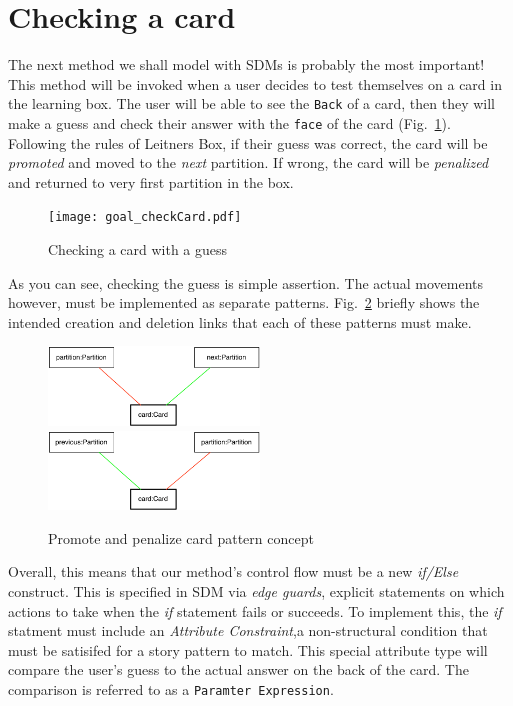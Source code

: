 \newpage
\section{Checking a card}
\genHeader
\hypertarget{sec:checkCard}{}

The next method we shall model with SDMs is probably the most important! This method will be invoked when a user decides to test themselves on a card in the
learning box. The user will be able to see the \texttt{Back} of a card, then they will make a guess and check their answer with the \texttt{face} of the
card (Fig.~\ref{fig:goal_check}). Following the rules of Leitners Box, if their guess was correct, the card will be \emph{promoted} and moved to the
\emph{next} partition. If wrong, the card will be \emph{penalized} and returned to very first partition in the box.

\begin{figure}[htbp]
 	\centering
   \texttt{[image: goal\_checkCard.pdf]}
 	\caption{Checking a card with a guess}
 	\label{fig:goal_check}
\end{figure}
\FloatBarrier

As you can see, checking the guess is simple assertion. The actual movements however, must be implemented as separate patterns. Fig.~\ref{fig:patterns_check}
briefly shows the intended creation and deletion links that each of these patterns must make.

\begin{figure}[htbp]
 	\centering
   \includegraphics[width=0.5\textwidth]{checkCard_promote.pdf}
   \\ \vspace{1cm}
    \includegraphics[width=0.5\textwidth]{checkCard_penalize.pdf}
 	\caption{Promote and penalize card pattern concept}
 	\label{fig:patterns_check}
\end{figure}
\FloatBarrier

Overall, this means that our method's control flow must be a new \emph{if/Else} construct. This is specified in SDM via \emph{edge guards},
explicit statements on which actions to take when the \emph{if} statement fails or succeeds. To implement this, the \emph{if} statment must
include an \emph{Attribute Constraint},a non-structural condition that must be satisifed for a story pattern to match. This
special attribute type will compare the user's guess to the actual answer on the back of the card. The comparison is referred to as a \texttt{Paramter
Expression}.

